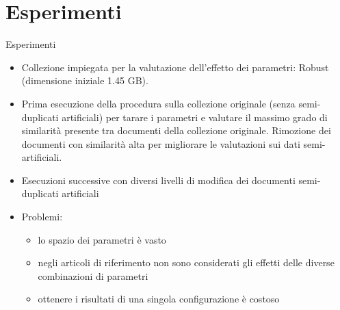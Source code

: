 \documentclass[10pt]{beamer}
\begin{document}
\section{Esperimenti}
\begin{frame}{Esperimenti}
\begin{itemize}
	\item Collezione impiegata per la valutazione dell'effetto dei parametri: Robust (dimensione iniziale 1.45 GB).
	\item Prima esecuzione della procedura sulla collezione originale (senza semi-duplicati artificiali) per tarare i parametri e valutare il massimo grado di similarità presente tra documenti della collezione originale. Rimozione dei documenti con similarità alta per migliorare le valutazioni sui dati semi-artificiali. 
	\item Esecuzioni successive con diversi livelli di modifica dei documenti semi-duplicati artificiali
	\item Problemi:
	\begin{itemize}
		\item lo spazio dei parametri è vasto
		\item negli articoli di riferimento non sono considerati gli effetti delle diverse combinazioni di parametri
		\item ottenere i risultati di una singola configurazione è costoso
	\end{itemize}
\end{itemize}
\end{frame}
\end{document}
